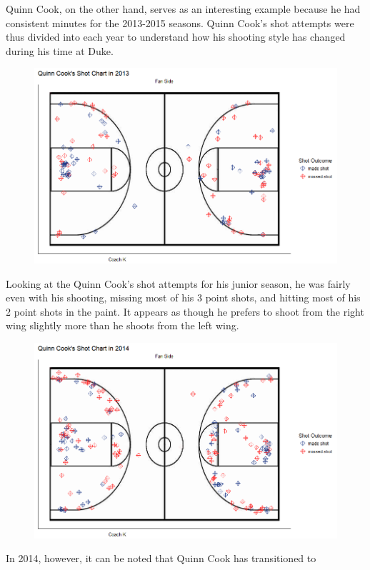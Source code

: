 \documentclass[12pt,twoside]{dukestatscithesis}
\theoremstyle{definition}
\theoremstyle{definition}
\theoremstyle{definition}
\theoremstyle{remark}
\begin{document}
Quinn Cook, on the other hand, serves as an interesting example because
he had consistent minutes for the 2013-2015 seasons. Quinn Cook's shot
attempts were thus divided into each year to understand how his shooting
style has changed during his time at Duke.
\begin{figure}
\centering
\includegraphics{img/shotchart_quinncook2013.png}
\caption{}
\end{figure}
Looking at the Quinn Cook's shot attempts for his junior season, he was
fairly even with his shooting, missing most of his 3 point shots, and
hitting most of his 2 point shots in the paint. It appears as though he
prefers to shoot from the right wing slightly more than he shoots from
the left wing.
\begin{figure}
\centering
\includegraphics{img/shotchart_quinncook2014.png}
\caption{}
\end{figure}
In 2014, however, it can be noted that Quinn Cook has transitioned to
\end{document}
